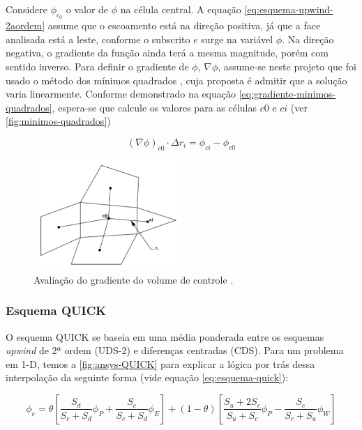 Considere $\phi_{c_0}$ o valor de $\phi$ na célula central. A equação \ref{eq:esquema-upwind-2aordem} assume que o escoamento está na direção positiva, já que a face analisada está a leste, conforme o subscrito $e$ surge na variável $\phi$. Na direção negativa, o gradiente da função ainda terá a mesma magnitude, porém com sentido inverso. Para definir o gradiente de $\phi$, $\nabla\phi$, assume-se neste projeto que foi usado o método dos mínimos quadrados \cite{Anderson1994}, cuja proposta é admitir que a solução varia linearmente. Conforme demonstrado na equação \ref{eq:gradiente-minimos-quadrados}, espera-se que calcule os valores para as células $c0$ e $ci$ (ver \autoref{fig:minimos-quadrados})

\begin{equation} \label{eq:gradiente-minimos-quadrados}
    \left(\nabla\phi\right)_{c0} \cdot \Delta r_i = \phi_{ci} - \phi_{c0}
\end{equation}

\begin{figure}[!ht]
	\centering
	\includegraphics[width=0.5\textwidth]{foto02-minimos-quadrados.png}
	\caption[Avaliação do gradiente do volume de controle]{Avaliação do gradiente do volume de controle \cite{fluent2021ansys}.}
	\label{fig:minimos-quadrados}
\end{figure}
 
\subsubsection{Esquema QUICK}

O esquema QUICK \cite{Leonard1990} se baseia em uma média ponderada entre os esquemas \textit{upwind} de 2ª ordem (UDS-2) e diferenças centradas (CDS). Para um problema em 1-D, temos a \autoref{fig:ansys-QUICK} para explicar a lógica por trás dessa interpolação da seguinte forma (vide equação \ref{eq:esquema-quick}):

\begin{equation}
	\label{eq:esquema-quick}
	\phi_e = \theta\left[\frac{S_d}{S_c+S_d}\phi_P + \frac{S_c}{S_c+S_d}\phi_E \right] + (1 - \theta)\left[\frac{S_u+2S_c}{S_u+S_c}\phi_P - \frac{S_c}{S_c+S_u}\phi_W \right]
\end{equation}

